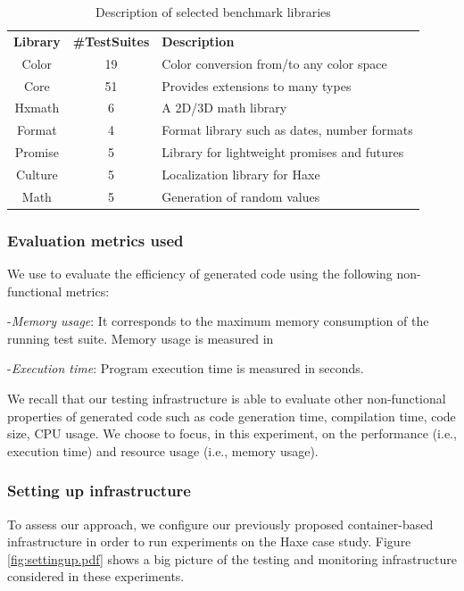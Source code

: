 \begin{table}[h]
	\centering
	
		\begin{tabular}{|c|c|p{8.5cm}|}				
			\hline
			\textbf{Library} & \textbf{\#TestSuites} & \textbf{Description} \\
			\hhline{|=|=|=|}
			Color  &  19 &  Color conversion from/to any color space   \\ \hline
			Core & 51  & Provides extensions to many types  \\ \hline
			Hxmath & 6  & A 2D/3D math library  \\ \hline
			Format  &  4 & Format library such as dates, number formats   \\ \hline
			Promise & 5  & Library for lightweight promises and futures  \\ \hline
			Culture & 5  & Localization library for Haxe \\ \hline
			Math & 5  & Generation of random values \\ \hline
		\end{tabular}
	
	\caption{Description of selected benchmark libraries}
	\label{tab:Description of selected benchmark libraries}
\end{table}

\subsubsection{Evaluation metrics used}
We use to evaluate the efficiency of generated code using the following non-functional metrics:

-\textit{Memory usage}:
It corresponds to the maximum memory consumption of the running test suite. Memory usage is measured in \SI{}{\mega\byte}

-\textit{Execution time}:
Program execution time is measured in seconds.

We recall that our testing infrastructure is able to evaluate other non-functional properties of generated code such as code generation time, compilation time, code size, CPU usage. We choose to focus, in this experiment, on the performance (i.e., execution time) and resource usage (i.e., memory usage).

\subsubsection{Setting up infrastructure}

To assess our approach, we configure our previously proposed container-based infrastructure in order to run experiments on the Haxe case study.
Figure \ref{fig:settingup.pdf} shows a big picture of the testing and monitoring infrastructure considered in these experiments.


